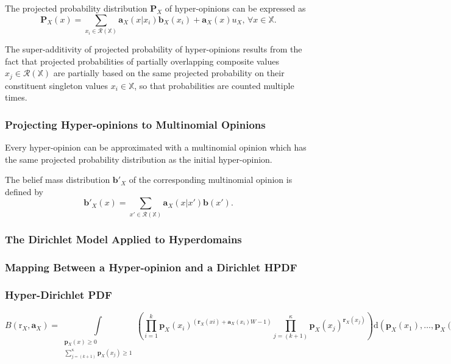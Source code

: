 The projected probability distribution $\mathbf{P}_X$ of hyper-opinions can be expressed as
\begin{equation}
    \mathbf{P}_X(x) = \sum\limits_{x_i \in \mathcal{R}(\mathbb{X})} \mathbf{a}_X(x|x_i) \mathbf{b}_X(x_i) + \mathbf{a}_X(x) u_X \text{, } \forall x \in \mathbb{X}.
\end{equation}

The super-additivity of projected probability of hyper-opinions results from the fact that projected probabilities of partially overlapping composite values $x_j \in \mathcal{R}(\mathbb{X})$ are partially based on
the same projected probability on their constituent singleton values $x_i \in \mathbb{X}$, so that
probabilities are counted multiple times.

\subsubsection{Projecting Hyper-opinions to Multinomial Opinions}

Every
hyper-opinion can be approximated with a multinomial opinion which has the same
projected probability distribution as the initial hyper-opinion.

The belief mass distribution $\mathbf{b}'_X$ of the corresponding multinomial opinion is defined by
\begin{equation}
    \mathbf{b}'_X(x) = \sum\limits_{x' \in \mathcal{R}(\mathbb{X})} \mathbf{a}_X(x|x') \mathbf{b}(x')\text{.}
\end{equation}


\subsubsection{The Dirichlet Model Applied to Hyperdomains}

\subsubsection{Mapping Between a Hyper-opinion and a Dirichlet HPDF}

\subsubsection{Hyper-Dirichlet PDF}

\begin{equation}
B(\mathrm{r}_X, \mathbf{a}_X) = \int\limits_{\substack{\mathbf{p}_X(x) \geq 0 \\ \sum\limits_{j = (k + 1)}^{\kappa} \mathbf{p}_X(x_j) \geq 1}} \left( \prod\limits_{i = 1}^{k} \mathbf{p}_X(x_i)^{(\mathbf{r}_X(xi) + \mathbf{a}_X(x_i) W - 1)} \prod\limits_{j = (k + 1)}^{\kappa} \mathbf{p}_X(x_j)^{\mathbf{r}_X(x_j)} \right) \mathrm{d}(\mathbf{p}_X(x_1),\dots,\mathbf{p}_X(k_\kappa))\text{.}
\end{equation}


